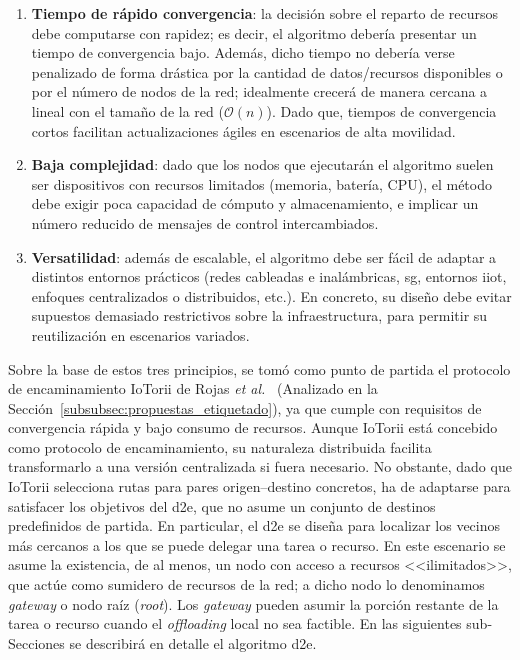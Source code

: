 \begin{enumerate}

    \item \textbf{Tiempo de rápido convergencia}: la decisión sobre el reparto de recursos debe computarse con rapidez; es decir, el algoritmo debería presentar un tiempo de convergencia bajo. Además, dicho tiempo no debería verse penalizado de forma drástica por la cantidad de datos/recursos disponibles o por el número de nodos de la red; idealmente crecerá de manera cercana a lineal con el tamaño de la red ($\mathcal{O}(n)$). Dado que, tiempos de convergencia cortos facilitan actualizaciones ágiles en escenarios de alta movilidad.
    
    \item \textbf{Baja complejidad}: dado que los nodos que ejecutarán el algoritmo suelen ser dispositivos con recursos limitados (memoria, batería, CPU), el método debe exigir poca capacidad de cómputo y almacenamiento, e implicar un número reducido de mensajes de control intercambiados.
    
    \item \textbf{Versatilidad}: además de escalable, el algoritmo debe ser fácil de adaptar a distintos entornos prácticos (redes cableadas e inalámbricas, \gls{sg}, entornos \gls{iiot}, enfoques centralizados o distribuidos, etc.). En concreto, su diseño debe evitar supuestos demasiado restrictivos sobre la infraestructura, para permitir su reutilización en escenarios variados.
\end{enumerate}

Sobre la base de estos tres principios, se tomó como punto de partida el protocolo de encaminamiento IoTorii de Rojas \textit{et al.}~\cite{rojas2021outperforming} (Analizado en la Sección~\ref{subsubsec:propuestas_etiquetado}), ya que cumple con requisitos de convergencia rápida y bajo consumo de recursos. Aunque IoTorii está concebido como protocolo de encaminamiento, su naturaleza distribuida facilita transformarlo a una versión centralizada si fuera necesario. No obstante, dado que IoTorii selecciona rutas para pares origen–destino concretos, ha de adaptarse para satisfacer los objetivos del \gls{d2e}, que no asume un conjunto de destinos predefinidos de partida. En particular, el \gls{d2e} se diseña para localizar los vecinos más cercanos a los que se puede delegar una tarea o recurso. En este escenario se asume la existencia, de al menos, un nodo con acceso a recursos <<ilimitados>>, que actúe como sumidero de recursos de la red; a dicho nodo lo denominamos \textit{gateway} o nodo raíz (\textit{root}). Los \textit{gateway} pueden asumir la porción restante de la tarea o recurso cuando el \textit{offloading} local no sea factible. En las siguientes sub-Secciones se describirá en detalle el algoritmo \gls{d2e}.

